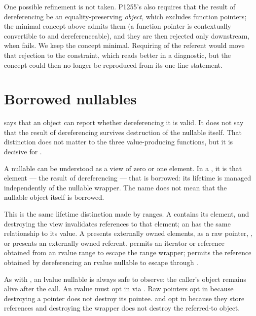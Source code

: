 \documentclass[a4paper,10pt,oneside,openany,final,article]{memoir}
\begin{document}
One possible refinement is not taken. P1255's
 also
requires that the result of dereferencing be an equality-preserving
\emph{object}, which excludes function pointers; the minimal concept above
admits them (a function pointer is contextually convertible to 
and dereferenceable), and they are then rejected only downstream, when
 fails. We keep the concept minimal. Requiring
 of the referent would move that rejection to the
constraint, which reads better in a diagnostic, but the concept could then
no longer be reproduced from its one-line statement.

\section{Borrowed nullables}

 says that an object can report whether dereferencing it is
valid. It does not say that the result of dereferencing survives destruction
of the nullable itself. That distinction does not matter to the three
value-producing functions, but it is decisive for .

A nullable can be understood as a view of zero or one element. In a
, it is that element --- the result of dereferencing
--- that is borrowed: its lifetime is managed independently of the nullable
wrapper. The name does not mean that the nullable object itself is borrowed.

This is the same lifetime distinction made by ranges. A
 contains its element, and destroying the view
invalidates references to that element; an  has the same
relationship to its value. A  presents externally owned
elements, as a raw pointer, , or
 presents an externally owned referent.
 permits an iterator or reference obtained from an
rvalue range to escape the range wrapper;  permits
the reference obtained by dereferencing an rvalue nullable to escape through
.

As with , an lvalue nullable is always safe to observe:
the caller's object remains alive after the call. An rvalue must opt in via
. Raw pointers opt in because destroying a
pointer does not destroy its pointee.  and
 opt in because they store references and destroying
the wrapper does not destroy the referred-to object.
\end{document}
